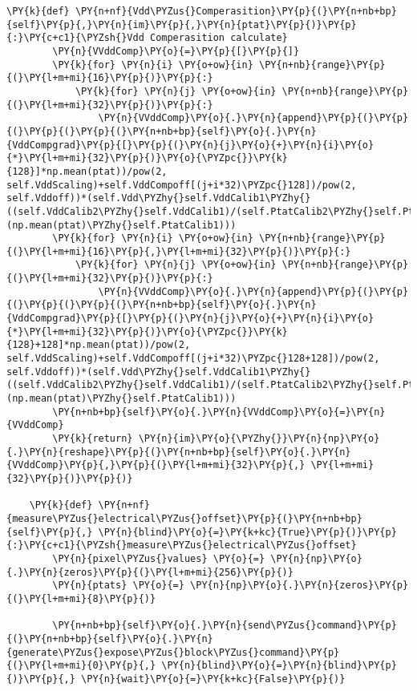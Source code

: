 \begin{tcolorbox}[breakable, size=fbox, boxrule=1pt, pad at break*=1mm,colback=cellbackground, colframe=cellborder]
\begin{Verbatim}[commandchars=\\\{\}]
	\PY{k}{def} \PY{n+nf}{Vdd\PYZus{}Comperasition}\PY{p}{(}\PY{n+nb+bp}{self}\PY{p}{,}\PY{n}{im}\PY{p}{,}\PY{n}{ptat}\PY{p}{)}\PY{p}{:}\PY{c+c1}{\PYZsh{}Vdd Comperasition calculate}
		\PY{n}{VVddComp}\PY{o}{=}\PY{p}{[}\PY{p}{]}
		\PY{k}{for} \PY{n}{i} \PY{o+ow}{in} \PY{n+nb}{range}\PY{p}{(}\PY{l+m+mi}{16}\PY{p}{)}\PY{p}{:}
			\PY{k}{for} \PY{n}{j} \PY{o+ow}{in} \PY{n+nb}{range}\PY{p}{(}\PY{l+m+mi}{32}\PY{p}{)}\PY{p}{:}
				\PY{n}{VVddComp}\PY{o}{.}\PY{n}{append}\PY{p}{(}\PY{p}{(}\PY{p}{(}\PY{p}{(}\PY{n+nb+bp}{self}\PY{o}{.}\PY{n}{VddCompgrad}\PY{p}{[}\PY{p}{(}\PY{n}{j}\PY{o}{+}\PY{n}{i}\PY{o}{*}\PY{l+m+mi}{32}\PY{p}{)}\PY{o}{\PYZpc{}}\PY{k}{128}]*np.mean(ptat))/pow(2, self.VddScaling)+self.VddCompoff[(j+i*32)\PYZpc{}128])/pow(2, self.Vddoff))*(self.Vdd\PYZhy{}self.VddCalib1\PYZhy{}((self.VddCalib2\PYZhy{}self.VddCalib1)/(self.PtatCalib2\PYZhy{}self.PtatCalib1))*(np.mean(ptat)\PYZhy{}self.PtatCalib1)))
		\PY{k}{for} \PY{n}{i} \PY{o+ow}{in} \PY{n+nb}{range}\PY{p}{(}\PY{l+m+mi}{16}\PY{p}{,}\PY{l+m+mi}{32}\PY{p}{)}\PY{p}{:}
			\PY{k}{for} \PY{n}{j} \PY{o+ow}{in} \PY{n+nb}{range}\PY{p}{(}\PY{l+m+mi}{32}\PY{p}{)}\PY{p}{:}
				\PY{n}{VVddComp}\PY{o}{.}\PY{n}{append}\PY{p}{(}\PY{p}{(}\PY{p}{(}\PY{p}{(}\PY{n+nb+bp}{self}\PY{o}{.}\PY{n}{VddCompgrad}\PY{p}{[}\PY{p}{(}\PY{n}{j}\PY{o}{+}\PY{n}{i}\PY{o}{*}\PY{l+m+mi}{32}\PY{p}{)}\PY{o}{\PYZpc{}}\PY{k}{128}+128]*np.mean(ptat))/pow(2, self.VddScaling)+self.VddCompoff[(j+i*32)\PYZpc{}128+128])/pow(2, self.Vddoff))*(self.Vdd\PYZhy{}self.VddCalib1\PYZhy{}((self.VddCalib2\PYZhy{}self.VddCalib1)/(self.PtatCalib2\PYZhy{}self.PtatCalib1))*(np.mean(ptat)\PYZhy{}self.PtatCalib1)))
		\PY{n+nb+bp}{self}\PY{o}{.}\PY{n}{VVddComp}\PY{o}{=}\PY{n}{VVddComp}
		\PY{k}{return} \PY{n}{im}\PY{o}{\PYZhy{}}\PY{n}{np}\PY{o}{.}\PY{n}{reshape}\PY{p}{(}\PY{n+nb+bp}{self}\PY{o}{.}\PY{n}{VVddComp}\PY{p}{,}\PY{p}{(}\PY{l+m+mi}{32}\PY{p}{,} \PY{l+m+mi}{32}\PY{p}{)}\PY{p}{)}

	\PY{k}{def} \PY{n+nf}{measure\PYZus{}electrical\PYZus{}offset}\PY{p}{(}\PY{n+nb+bp}{self}\PY{p}{,} \PY{n}{blind}\PY{o}{=}\PY{k+kc}{True}\PY{p}{)}\PY{p}{:}\PY{c+c1}{\PYZsh{}measure\PYZus{}electrical\PYZus{}offset}
		\PY{n}{pixel\PYZus{}values} \PY{o}{=} \PY{n}{np}\PY{o}{.}\PY{n}{zeros}\PY{p}{(}\PY{l+m+mi}{256}\PY{p}{)}
		\PY{n}{ptats} \PY{o}{=} \PY{n}{np}\PY{o}{.}\PY{n}{zeros}\PY{p}{(}\PY{l+m+mi}{8}\PY{p}{)}
        
        \PY{n+nb+bp}{self}\PY{o}{.}\PY{n}{send\PYZus{}command}\PY{p}{(}\PY{n+nb+bp}{self}\PY{o}{.}\PY{n}{generate\PYZus{}expose\PYZus{}block\PYZus{}command}\PY{p}{(}\PY{l+m+mi}{0}\PY{p}{,} \PY{n}{blind}\PY{o}{=}\PY{n}{blind}\PY{p}{)}\PY{p}{,} \PY{n}{wait}\PY{o}{=}\PY{k+kc}{False}\PY{p}{)}


\end{Verbatim}
\end{tcolorbox}
